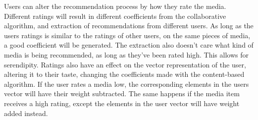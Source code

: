 Users can alter the recommendation process by how they rate the media. Different ratings will result in different coefficients from the collaborative algorithm, and extraction of recommendations from different users. As long as the users ratings is similar to the ratings of other users, on the same pieces of media, a good coefficient will be generated. The extraction also doesn’t care what kind of media is being recommended, as long as they’ve been rated high. This allows for serendipity. Ratings also have an effect on the vector representation of the user, altering it to their taste, changing the coefficients made with the content-based algorithm. If the user rates a media low, the corresponding elements in the users vector will have their weight subtracted. The same happens if the media item receives a high rating, except the elements in the user vector will have weight added instead.